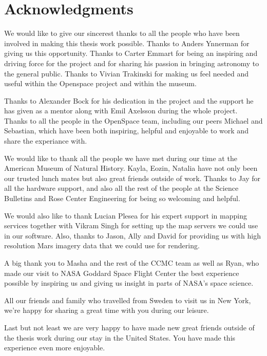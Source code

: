 \cleardoublepage
{}
{}
\chapter*{Acknowledgments}

We would like to give our sincerest thanks to all the people who have been involved in making this thesis work possible. Thanks to Anders Ynnerman for giving us this opportunity. Thanks to Carter Emmart for being an inspiring and driving force for the project and for sharing his passion in bringing astronomy to the general public. Thanks to Vivian Trakinski for making us feel needed and useful within the Openspace project and within the museum.

Thanks to Alexander Bock for his dedication in the project and the support he has given as a mentor along with Emil Axelsson during the whole project. Thanks to all the people in the OpenSpace team, including our peers Michael and Sebastian, which have been both inspiring, helpful and enjoyable to work and share the experiance with.

We would like to thank all the people we have met during our time at the American Museum of Natural History. Kayla, Eozin, Natalia have not only been our trusted lunch mates but also great friends outside of work.
Thanks to Jay for all the hardware support, and also all the rest of the people at the Science Bulletins and Rose Center Engineering for being so welcoming and helpful.

We would also like to thank Lucian Plesea for his expert support in mapping services together with Vikram Singh for setting up the map servers we could use in our software. Also, thanks to Jason, Ally and David for providing us with high resolution Mars imagery data that we could use for rendering.

A big thank you to Masha and the rest of the CCMC team as well as Ryan, who made our visit to NASA Goddard Space Flight Center the best experience possible by inspiring us and giving us insight in parts of NASA's space science.

All our friends and family who travelled from Sweden to visit us in New York, we're happy for sharing a great time with you during our leisure. 

Last but not least we are very happy to have made new great friends outside of the thesis work during our stay in the United States. You have made this experience even more enjoyable.

\newpage
